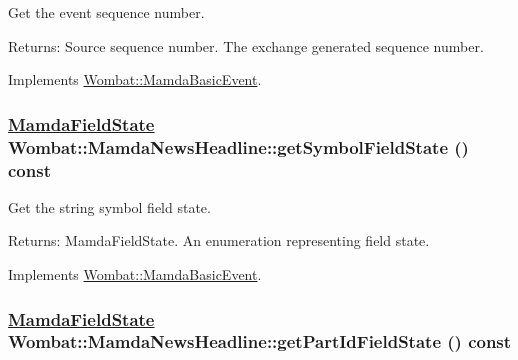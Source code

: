 Get the event sequence number. 

\begin{Desc}
\item[Returns:]Source sequence number. The exchange generated sequence number. \end{Desc}


Implements \hyperlink{classWombat_1_1MamdaBasicEvent_1fd845d48e95b4ee3beafc72d1ac2adf}{Wombat::Mamda\-Basic\-Event}.\hypertarget{classWombat_1_1MamdaNewsHeadline_3eabde22221b2e826739c8c9a2f40b9f}{
\subsubsection[getSymbolFieldState]{\setlength{\rightskip}{0pt plus 5cm}\hyperlink{namespaceWombat_93aac974f2ab713554fd12a1fa3b7d2a}{Mamda\-Field\-State} Wombat::Mamda\-News\-Headline::get\-Symbol\-Field\-State () const}}
\label{classWombat_1_1MamdaNewsHeadline_3eabde22221b2e826739c8c9a2f40b9f}


Get the string symbol field state. 

\begin{Desc}
\item[Returns:]Mamda\-Field\-State. An enumeration representing field state. \end{Desc}


Implements \hyperlink{classWombat_1_1MamdaBasicEvent_ef95e19f4babb0e5ea8549d6cf29d13f}{Wombat::Mamda\-Basic\-Event}.\hypertarget{classWombat_1_1MamdaNewsHeadline_10f8732e6a2cdcd78b4aa2d538a0d8e0}{
\subsubsection[getPartIdFieldState]{\setlength{\rightskip}{0pt plus 5cm}\hyperlink{namespaceWombat_93aac974f2ab713554fd12a1fa3b7d2a}{Mamda\-Field\-State} Wombat::Mamda\-News\-Headline::get\-Part\-Id\-Field\-State () const}}
\label{classWombat_1_1MamdaNewsHeadline_10f8732e6a2cdcd78b4aa2d538a0d8e0}


